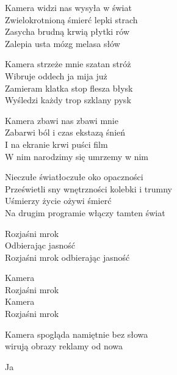 \begin{text}
    Kamera widzi nas wysyła w świat\\
    Zwielokrotnioną śmierć lepki strach\\
    Zasycha brudną krwią płytki rów\\
    Zalepia usta mózg melasa słów

    Kamera strzeże mnie szatan stróż\\
    Wibruje oddech ja mija już\\
    Zamieram klatka stop flesza błysk\\
    Wyśledzi każdy trop szklany pysk

    Kamera zbawi nas zbawi mnie\\
    Zabarwi ból i czas ekstazą śnień\\
    I na ekranie krwi puści film\\
    W nim narodzimy się umrzemy w nim

    Nieczułe światłoczułe oko opaczności\\
    Prześwietli sny wnętrzności kolebki i trumny\\
    Uśmierzy życie ożywi śmierć\\
    Na drugim programie włączy tamten świat

    Rozjaśni mrok\\
    Odbierając jasność\\
    Rozjaśni mrok odbierając jasność

    Kamera\\
    Rozjaśni mrok\\
    Kamera\\
    Rozjaśni mrok

    Kamera spogląda namiętnie bez słowa\\
    wirują obrazy reklamy od nowa

    Ja
\end{text}
\begin{chord}

\end{chord}